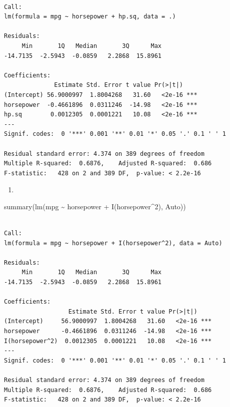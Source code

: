 \documentclass[
  letterpaper,
  DIV=11,
  numbers=noendperiod]{scrreprt}
\newenvironment{Shaded}{\begin{snugshade}}{\end{snugshade}}
\newcommand{\DecValTok}[1]{\textcolor[rgb]{0.47,0.16,0.63}{#1}}
\newcommand{\FunctionTok}[1]{\textcolor[rgb]{0.02,0.16,0.49}{#1}}
\newcommand{\NormalTok}[1]{\textcolor[rgb]{0.33,0.33,0.33}{#1}}
\newcommand{\SpecialCharTok}[1]{\textcolor[rgb]{0.00,0.46,0.62}{#1}}
\providecommand{\tightlist}{%
  \setlength{\itemsep}{0pt}\setlength{\parskip}{0pt}}\usepackage{longtable,booktabs,array}
\begin{document}
\begin{verbatim}

Call:
lm(formula = mpg ~ horsepower + hp.sq, data = .)

Residuals:
     Min       1Q   Median       3Q      Max 
-14.7135  -2.5943  -0.0859   2.2868  15.8961 

Coefficients:
              Estimate Std. Error t value Pr(>|t|)    
(Intercept) 56.9000997  1.8004268   31.60   <2e-16 ***
horsepower  -0.4661896  0.0311246  -14.98   <2e-16 ***
hp.sq        0.0012305  0.0001221   10.08   <2e-16 ***
---
Signif. codes:  0 '***' 0.001 '**' 0.01 '*' 0.05 '.' 0.1 ' ' 1

Residual standard error: 4.374 on 389 degrees of freedom
Multiple R-squared:  0.6876,    Adjusted R-squared:  0.686 
F-statistic:   428 on 2 and 389 DF,  p-value: < 2.2e-16
\end{verbatim}

\begin{enumerate}
\def\labelenumi{\arabic{enumi}.}
\setcounter{enumi}{1}
\tightlist
\item
\end{enumerate}

\begin{Shaded}
\begin{Highlighting}[]
\FunctionTok{summary}\NormalTok{(}\FunctionTok{lm}\NormalTok{(mpg }\SpecialCharTok{\textasciitilde{}}\NormalTok{ horsepower }\SpecialCharTok{+} \FunctionTok{I}\NormalTok{(horsepower}\SpecialCharTok{\^{}}\DecValTok{2}\NormalTok{), Auto))}
\end{Highlighting}
\end{Shaded}

\begin{verbatim}

Call:
lm(formula = mpg ~ horsepower + I(horsepower^2), data = Auto)

Residuals:
     Min       1Q   Median       3Q      Max 
-14.7135  -2.5943  -0.0859   2.2868  15.8961 

Coefficients:
                  Estimate Std. Error t value Pr(>|t|)    
(Intercept)     56.9000997  1.8004268   31.60   <2e-16 ***
horsepower      -0.4661896  0.0311246  -14.98   <2e-16 ***
I(horsepower^2)  0.0012305  0.0001221   10.08   <2e-16 ***
---
Signif. codes:  0 '***' 0.001 '**' 0.01 '*' 0.05 '.' 0.1 ' ' 1

Residual standard error: 4.374 on 389 degrees of freedom
Multiple R-squared:  0.6876,    Adjusted R-squared:  0.686 
F-statistic:   428 on 2 and 389 DF,  p-value: < 2.2e-16
\end{verbatim}
\end{document}
